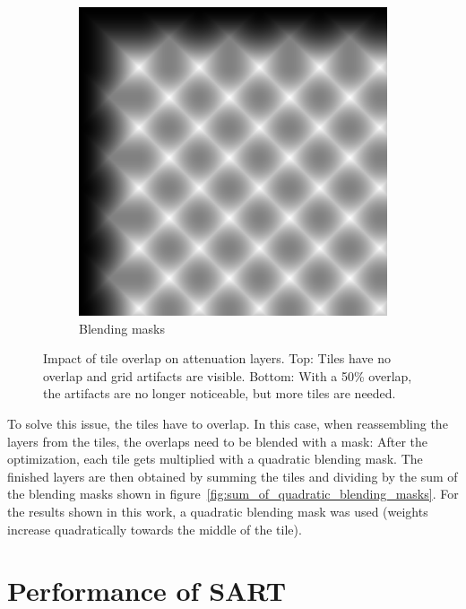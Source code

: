 \begin{figure}[tb]
\begin{subfigure}{0.23\textwidth}
		\vspace{0.15cm}
		
		\includegraphics[width = \textwidth]{../Figures/tiling/tarot_tiles5x5x200x200_overlap0.5_3_layers/blendingMaskSum.png}
		\caption{Blending masks}
	\end{subfigure}%
	\caption[Impact of tile overlap on attenuation layers]
			{Impact of tile overlap on attenuation layers.
			 Top: Tiles have no overlap and grid artifacts are visible.
			 Bottom: With a 50\% overlap, the artifacts are no longer noticeable, but more tiles are needed.}
	\label{fig:comparison_tile_overlap_vs_no_overlap}
\end{figure} 
To solve this issue, the tiles have to overlap. 
In this case, when reassembling the layers from the tiles, the overlaps need to be blended with a mask:
After the optimization, each tile gets multiplied with a quadratic blending mask.
The finished layers are then obtained by summing the tiles and dividing by the sum of the blending masks shown in figure~\ref{fig:sum_of_quadratic_blending_masks}.
For the results shown in this work, a quadratic blending mask was used (weights increase quadratically towards the middle of the tile).

\section{Performance of SART}
\label{sec:performance_of_SART}

